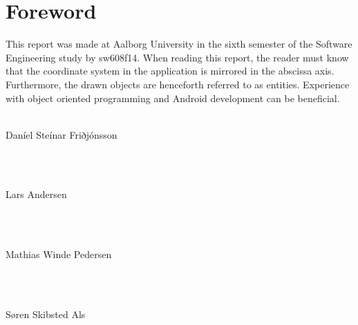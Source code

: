 \chapter*{Foreword}
\noindent This report was made at Aalborg University in the sixth semester of the Software Engineering study by sw608f14. 
When reading this report, the reader must know that the coordinate system in the application is mirrored in the abscissa axis. 
Furthermore, the drawn objects are henceforth referred to as entities. 
Experience with object oriented programming and Android development can be beneficial.  \\ \\



\noindent
\vspace{5mm}
\parbox[h]{4cm}{Daníel Steínar Friðjónsson}\hspace{0.5cm} \makebox[7cm]{\hrulefill} \\ \\
\vspace{5mm}
\parbox[h]{4cm}{Lars Andersen}\hspace{0.5cm} \makebox[7cm]{\hrulefill} \\ \\
\vspace{5mm}
\parbox[h]{4cm}{Mathias Winde Pedersen}\hspace{0.5cm} \makebox[7cm]{\hrulefill} \\ \\
\vspace{5mm}
\parbox[h]{4cm}{S\o ren Skibsted Als}\hspace{0.5cm} \makebox[7cm]{\hrulefill} \\ \\
\newpage